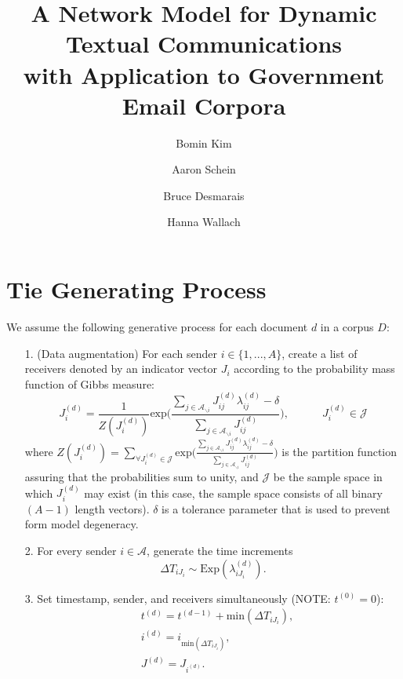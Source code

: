 \documentclass[a4paper]{article}
\title{A Network Model for Dynamic Textual Communications \\with Application to
	Government Email Corpora}
\author[1]{Bomin Kim}
\author[3]{Aaron Schein}
\author[1]{Bruce Desmarais}
\author[2,3]{Hanna Wallach}
\affil[1]{Pennsylvania State University}
\affil[2]{Microsoft Research NYC}
\affil[3]{University of Massachusetts Amherst}
\begin{document}
\maketitle
\section{Tie Generating Process}\label{subsec: Tie Generating Process}
We assume the following generative process for each document $d$ in a corpus $D$:
\begin{itemize}
	\item[1.] (Data augmentation) For each sender $i \in \{1,...,A\}$, create a list of receivers denoted by  an indicator vector $J_i$ according to the probability mass function of Gibbs measure:
	\begin{equation}J^{(d)}_{i} = \frac{1}{Z(J^{(d)}_i)}\mbox{exp}\Big(\frac{\sum_{j \in \mathcal{A}_{\backslash i}}J^{(d)}_{ij}\lambda^{(d)}_{ij} - \delta}{\sum\limits_{j \in \mathcal{A}_{\backslash i}}J^{(d)}_{ij}}\Big), \quad\quad\quad J^{(d)}_{i} \in \mathcal{J}
	\end{equation}
	where $Z(J^{(d)}_i) = \sum\limits_{\forall J^{(d)}_i \in \mathcal{J}}\mbox{exp}\Big(\frac{\sum_{j \in \mathcal{A}_{\backslash i}}J^{(d)}_{ij}\lambda^{(d)}_{ij} - \delta}{\sum\limits_{j \in \mathcal{A}_{\backslash i}}J^{(d)}_{ij}}\Big)$ is the partition function assuring that the probabilities sum to unity, and $\mathcal{J}$ be the sample space in which $J^{(d)}_i$ may exist (in this case, the sample space consists of all binary $(A-1)$ length vectors). $\delta$ is a tolerance parameter that is used to prevent form model degeneracy.
	\item[2.] For every sender $i \in \mathcal{A}$, generate the time increments \begin{equation}
	\Delta T_{i{J_i}} \sim \mbox{Exp}(\lambda_{i{J_i}}^{(d)}).
	\end{equation}
	\item[3.] Set timestamp, sender, and receivers simultaneously (NOTE: $t^{(0)}=0$):
	\begin{equation}
	\begin{aligned}
	&t^{(d)} = t^{(d-1)}+\mbox{min}(\Delta T_{i{J_i}}),\\
	&i^{(d)} = i_{\mbox{min}(\Delta T_{i{J_i}})}, \\
	&J^{(d)} = J_{i^{(d)}}.
	\end{aligned}
	\end{equation}
\end{itemize}
\end{document}
